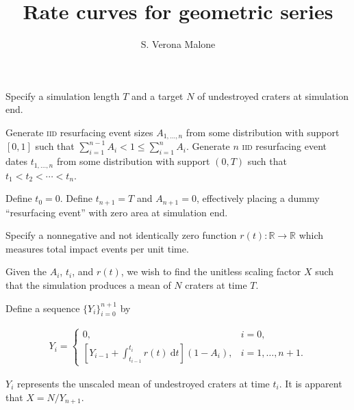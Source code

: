 \documentclass{amsart}
\title{Rate curves for geometric series}
\author{S. Verona Malone}
\begin{document}
\maketitle

Specify a simulation length \(T\) and a target \(N\) of undestroyed craters at simulation end.

Generate \textsc{iid} resurfacing event sizes \(A_{1,\dots,n}\) from some distribution with support \([0, 1]\) such that \(\sum_{i=1}^{n-1} A_i < 1 \leq \sum_{i=1}^n A_i\). Generate \(n\) \textsc{iid} resurfacing event dates \(t_{1,\dots,n}\) from some distribution with support \((0, T)\) such that \(t_1 < t_2 < \cdots < t_n\).

Define \(t_0 = 0\). Define \(t_{n + 1} = T\) and \(A_{n + 1} = 0\), effectively placing a dummy ``resurfacing event'' with zero area at simulation end.

Specify a nonnegative and not identically zero function \(r(t) : \mathbb R \to \mathbb R\) which measures total impact events per unit time.

Given the \(A_i\), \(t_i\), and \(r(t)\), we wish to find the unitless scaling factor \(X\) such that the simulation produces a mean of \(N\) craters at time \(T\).

Define a sequence \(\{Y_i\}_{i=0}^{n + 1}\) by

\begin{align*}
Y_i = \begin{cases} 0, &i=0, \\ \left[ Y_{i - 1} + \int_{t_{i-1}}^{t_i} r(t) ~\mathrm dt\right] (1 - A_i), &i = 1, \dots, n + 1. \end{cases}
\end{align*}

\(Y_i\) represents the unscaled mean of undestroyed craters at time \(t_i\). It is apparent that \(X = N / Y_{n + 1}\).
\end{document}
